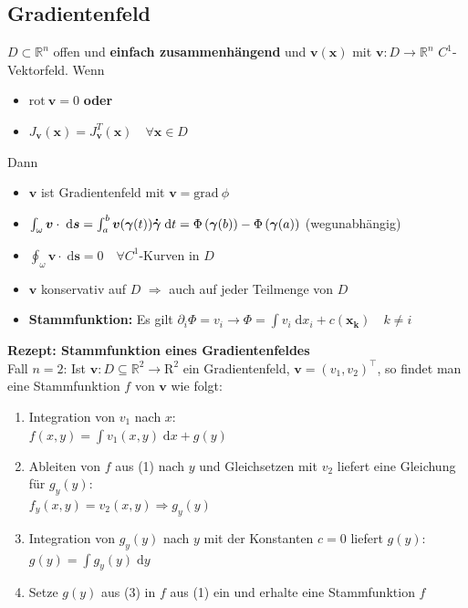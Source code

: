\documentclass[6pt,a4paper]{scrartcl}
\renewcommand{\vec}[1]{\ensuremath{\boldsymbol {#1}}}											%
\renewcommand{\emph}[1]{\textbf{#1}}															%
\renewcommand*{\dot}[1]{\accentset{\mbox{\textrm{\large\bfseries .}} }{#1}}						%
\newcommand{\Ra}[0]{\ensuremath{\Rightarrow}}									%
\newcommand{\ra}[0]{\ensuremath{\rightarrow}} 									%
\newcommand{\diff}{\ensuremath{\;\mathrm d}}									%
\newcommand{\grad}{\ensuremath{\mathrm{grad}\ }}								%
\newcommand{\rot}{\ensuremath{\mathrm{rot}\ }}									%
\newcommand{\R}{\ensuremath{\mathbb R}}
\begin{document}
\begin{multicols*}{4}
\subsection{Gradientenfeld}
$D \subset \R^n$ offen und \emph{einfach zusammenhängend} und $\vec{v}(\vec{x})$ mit $\vec{v}:D \ra \R^n$ $C^1$-Vektorfeld. Wenn
\begin{itemize}
	\item $\rot \vec{v} = 0$ \emph{oder}
	\item $J_{\vec{v}}(\vec{x}) = J_{\vec{v}}^T(\vec{x}) \quad \forall \vec{x} \in D$
\end{itemize}
Dann
\begin{itemize}
	\item $\vec{v}$ ist Gradientenfeld mit $\vec{v} = \grad{\phi}$
	\item $\int_{\omega}{\vec{v} \cdot \diff \vec{s}} = \int_a^b \vec v(\vec \gamma(t)) \dot{\vec \gamma} \diff t = \Phi\left(\vec{\gamma}(b)\right) - \Phi\left(\vec{\gamma}(a)\right)$ (wegunabhängig)
	\item $\oint_{\omega}{\vec{v} \cdot \diff \vec{s}} = 0 \quad \forall C^1$-Kurven in $D$
	\item $\vec{v}$ konservativ auf $D$ $\Ra$ auch auf jeder Teilmenge von $D$
	\item \emph{Stammfunktion:} Es gilt $\partial_i \Phi = v_i \ra \Phi = \int{v_i \diff x_i} + c(\vec{x_k}) \quad k \neq i$
\end{itemize}

\textbf{Rezept: Stammfunktion eines Gradientenfeldes} \\

Fall $n=2$: Ist $\vec v:D\subseteq \mathbb{R}^2\rightarrow\mathrm{R}^2$ ein Gradientenfeld, $\vec v=(v_1,v_2)^\top$, so findet man eine Stammfunktion $f$ von $\vec v$ wie folgt:
\begin{enumerate}
	\item Integration von $v_1$ nach $x$:\\
	$f(x,y)=\int {v_1(x,y)\diff x} + g(y)$
	\item Ableiten von $f$ aus (1) nach $y$ und Gleichsetzen mit $v_2$ liefert eine Gleichung für $g_y(y)$:\\
	$f_y(x,y)=v_2(x,y) \Rightarrow g_y(y)$
	\item Integration von $g_y(y)$ nach $y$ mit der Konstanten $c=0$ liefert $g(y)$: \\
	$g(y)=\int{g_y(y)\diff y}$
	\item Setze $g(y)$ aus (3) in $f$ aus (1) ein und erhalte eine Stammfunktion $f$
\end{enumerate}



\end{multicols*}
\end{document}

